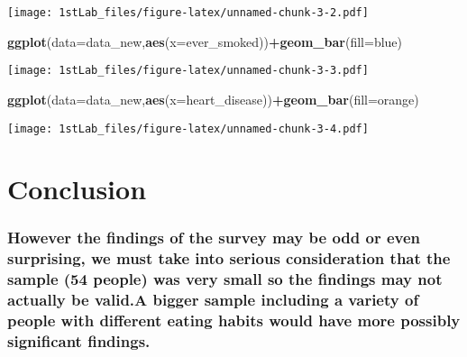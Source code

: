 \documentclass[
]{article}
\newenvironment{Shaded}{\begin{snugshade}}{\end{snugshade}}
\newcommand{\AttributeTok}[1]{\textcolor[rgb]{0.13,0.29,0.53}{#1}}
\newcommand{\FunctionTok}[1]{\textcolor[rgb]{0.13,0.29,0.53}{\textbf{#1}}}
\newcommand{\NormalTok}[1]{#1}
\newcommand{\SpecialCharTok}[1]{\textcolor[rgb]{0.81,0.36,0.00}{\textbf{#1}}}
\newcommand{\StringTok}[1]{\textcolor[rgb]{0.31,0.60,0.02}{#1}}
\begin{document}
\texttt{[image: 1stLab\_files/figure-latex/unnamed-chunk-3-2.pdf]}

\begin{Shaded}
\begin{Highlighting}[]
\FunctionTok{ggplot}\NormalTok{(}\AttributeTok{data=}\NormalTok{data\_new,}\FunctionTok{aes}\NormalTok{(}\AttributeTok{x=}\NormalTok{ever\_smoked))}\SpecialCharTok{+}\FunctionTok{geom\_bar}\NormalTok{(}\AttributeTok{fill=}\StringTok{\textquotesingle{}blue\textquotesingle{}}\NormalTok{)}
\end{Highlighting}
\end{Shaded}

\texttt{[image: 1stLab\_files/figure-latex/unnamed-chunk-3-3.pdf]}

\begin{Shaded}
\begin{Highlighting}[]
\FunctionTok{ggplot}\NormalTok{(}\AttributeTok{data=}\NormalTok{data\_new,}\FunctionTok{aes}\NormalTok{(}\AttributeTok{x=}\NormalTok{heart\_disease))}\SpecialCharTok{+}\FunctionTok{geom\_bar}\NormalTok{(}\AttributeTok{fill=}\StringTok{\textquotesingle{}orange\textquotesingle{}}\NormalTok{)}
\end{Highlighting}
\end{Shaded}

\texttt{[image: 1stLab\_files/figure-latex/unnamed-chunk-3-4.pdf]}

\hypertarget{conclusion}{%
\section{\texorpdfstring{\textbf{Conclusion}}{Conclusion}}\label{conclusion}}

\hypertarget{however-the-findings-of-the-survey-may-be-odd-or-even-surprising-we-must-take-into-serious-consideration-that-the-sample-54-people-was-very-small-so-the-findings-may-not-actually-be-valid.a-bigger-sample-including-a-variety-of-people-with-different-eating-habits-would-have-more-possibly-significant-findings.}{%
\subsubsection{However the findings of the survey may be odd or even
surprising, we must take into serious consideration that the sample (54
people) was very small so the findings may not actually be valid.A
bigger sample including a variety of people with different eating habits
would have more possibly significant
findings.}\label{however-the-findings-of-the-survey-may-be-odd-or-even-surprising-we-must-take-into-serious-consideration-that-the-sample-54-people-was-very-small-so-the-findings-may-not-actually-be-valid.a-bigger-sample-including-a-variety-of-people-with-different-eating-habits-would-have-more-possibly-significant-findings.}}
\end{document}
